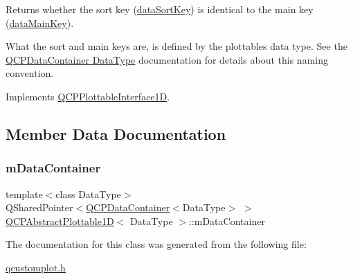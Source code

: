 Returns whether the sort key (\hyperlink{class_q_c_p_abstract_plottable1_d_aa8277da921b009bce474437d50b4a2d8}{data\+Sort\+Key}) is identical to the main key (\hyperlink{class_q_c_p_abstract_plottable1_d_aeb156ebf5d3c8de906b428be30733ad8}{data\+Main\+Key}).

What the sort and main keys are, is defined by the plottable\textquotesingle{}s data type. See the \hyperlink{class_q_c_p_data_container_qcpdatacontainer-datatype}{Q\+C\+P\+Data\+Container Data\+Type} documentation for details about this naming convention. 

Implements \hyperlink{class_q_c_p_plottable_interface1_d_a229e65e7ab968dd6cd0e259fa504b79d}{Q\+C\+P\+Plottable\+Interface1D}.



\subsection{Member Data Documentation}
\mbox{\label{class_q_c_p_abstract_plottable1_d_ac139cf70590707a1fb40eabe97fac246}} 
\subsubsection{\texorpdfstring{m\+Data\+Container}{mDataContainer}}
{\footnotesize\ttfamily template$<$class Data\+Type$>$ \\
Q\+Shared\+Pointer$<$\hyperlink{class_q_c_p_data_container}{Q\+C\+P\+Data\+Container}$<$Data\+Type$>$ $>$ \hyperlink{class_q_c_p_abstract_plottable1_d}{Q\+C\+P\+Abstract\+Plottable1D}$<$ Data\+Type $>$\+::m\+Data\+Container\hspace{0.3cm}{\ttfamily [protected]}}



The documentation for this class was generated from the following file\+:\begin{DoxyCompactItemize}
\item 
\hyperlink{qcustomplot_8h}{qcustomplot.\+h}\end{DoxyCompactItemize}
